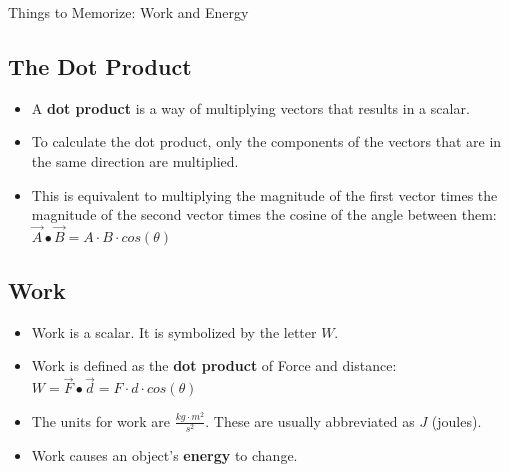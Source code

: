\documentclass[letterpaper, 12pt]{article}
\begin{document}
	


\begin{center}Things to Memorize: Work and Energy
\end{center}
\subsection*{The Dot Product}
\begin{itemize}
	\item A \textbf{dot product} is a way of multiplying vectors that results in a scalar. 
	\item To calculate the dot product, only the components of the vectors that are in the same direction are multiplied.
	\item This is equivalent to multiplying the magnitude of the first vector times the magnitude of the second vector times the cosine of the angle between them: $ \vec{A} \bullet \vec{B} = A \cdot B \cdot cos(\theta) $
\end{itemize}
\subsection*{Work}
\begin{itemize}
	\item Work is a scalar.  It is symbolized by the letter $ W $.  
	\item Work is defined as the \textbf{dot product} of Force and distance: $W = \vec{F} \bullet \vec{d} = F \cdot d \cdot cos(\theta) $
	\item The units for work are $ \frac{kg \cdot m^2}{s^2}$.  These are usually abbreviated as $J$ (joules). 
	\item Work causes an object's \textbf{energy} to change. 


	
\end{itemize}
\end{document}
